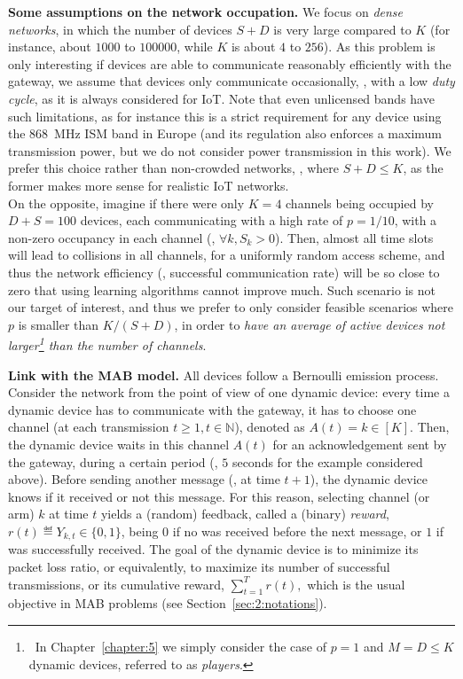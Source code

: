 \textbf{Some assumptions on the network occupation.}
%
We focus on \emph{dense networks}, in which the number of devices $S + D$ is very large compared to $K$ (for instance, about $1000$ to $100000$, while $K$ is about $4$ to $256$).
As this problem is only interesting if devices are able to communicate reasonably efficiently with the gateway, we assume that devices only communicate occasionally, \ie, with a low \emph{duty cycle}, as it is always considered for IoT.
Note that even unlicensed bands have such limitations, as for instance this is a strict requirement for any device using the \SI{868}{\mega\hertz} ISM band in Europe (and its regulation also enforces a maximum transmission power, but we do not consider power transmission in this work).
%
We prefer this choice rather than non-crowded networks, \ie, where $S + D \leq K$, as the former makes more sense for realistic IoT networks.\\
\indent
On the opposite, imagine if there were only $K=4$ channels being occupied by $D+S = 100$ devices, each communicating with a high rate of $p=1/10$, with a non-zero occupancy in each channel (\ie, $\forall k, S_k > 0$). Then, almost all time slots will lead to collisions in all channels, for a uniformly random access scheme, and thus the network efficiency (\ie, successful communication rate) will be so close to zero that using learning algorithms cannot improve much.
Such scenario is not our target of interest, and thus we prefer to only consider feasible scenarios where $p$ is smaller than $K/(S+D)$, in order to \emph{have an average of active devices not larger\footnote{~In Chapter~\ref{chapter:5} we simply consider the case of $p=1$ and $M = D \leq K$ dynamic devices, referred to as \emph{players}.} than the number of channels}.


\textbf{Link with the MAB model.}
%
All devices follow a Bernoulli emission process.
Consider the network from the point of view of one dynamic device:
every time a dynamic device has to communicate with the gateway,
it has to choose one channel (at each transmission $t \geq 1, t \in \mathbb{N}$), denoted as $A(t) = k \in[K]$.
Then, the dynamic device waits in this channel $A(t)$ for an acknowledgement sent by the gateway, during a certain period (\eg, $5$ seconds for the example considered above).
Before sending another message (\ie, at time $t+1$), the dynamic device knows if it received or not this \Ack{} message.
%
For this reason, selecting channel (or arm) $k$ at time $t$ yields a (random) feedback, called a (binary) \emph{reward}, $r(t) \eqdef Y_{k,t} \in \{0,1\}$, being $0$ if no \Ack{} was received before the next message, or $1$ if \Ack{} was successfully received.
The goal of the dynamic device is to minimize its packet loss ratio, or equivalently, to maximize its number of successful transmissions, or its cumulative reward,
$\sum_{t = 1}^T r(t),$
which is the usual objective in MAB problems (see Section~\ref{sec:2:notations}).


